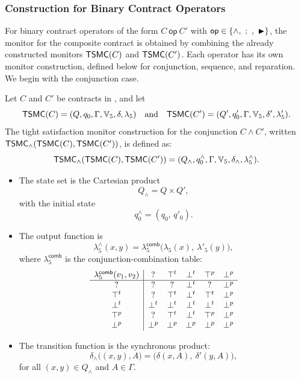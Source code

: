 \subsubsection*{Construction for Binary Contract Operators}

For binary contract operators of the form $C\ \textsf{op}\ C'$ with
$\textsf{op} \in \{\wedge,\ ;\ ,\ \repair\}$, the monitor for the composite contract is obtained by combining the already constructed monitors
$\mathsf{TSMC}(C)$ and $\mathsf{TSMC}(C')$. Each operator has its own monitor construction,
defined below for conjunction, sequence, and reparation. We begin with the
conjunction case.


\begin{definition}
\label{def:moore-5-conj}
Let $C$ and $C'$ be contracts in \cDL, and let
\[
\mathsf{TSMC}(C)  = (Q, q_0, \Gamma, \mathbb{V}_5 , \delta, \lambda_5)
\quad\text{and}\quad
\mathsf{TSMC}(C') = (Q', q'_0, \Gamma, \mathbb{V}_5 , \delta', \lambda'_5).
\]
The tight satisfaction monitor construction for the conjunction
$C \wedge C'$, written\\ $\mathsf{TSMC}_{\wedge}(\mathsf{TSMC}(C),\mathsf{TSMC}(C'))$, is defined as:
\[
\mathsf{TSMC}_{\wedge}(\mathsf{TSMC}(C),\mathsf{TSMC}(C'))
  = (Q_{\wedge}, q_0^{\wedge}, \Gamma, \mathbb{V}_5 , \delta_{\wedge}, \lambda_5^{\wedge}).
\]

\begin{itemize}
  \item The state set is the Cartesian product
  \[
    Q_{\wedge} = Q \times Q',
  \]
  with the initial state
  \[
    q_0^{\wedge} = (q_0,\,q'_0).
  \]

  \item The output function is
  \[
    \lambda_5^{\wedge}(x,y) =
    \lambda_{5}^{\textsf{comb}}\!\big(\lambda_5(x),\ \lambda'_5(y)\big),
  \]
  where $\lambda_{5}^{\textsf{comb}}$ is the conjunction-combination table:
  \[
  \begin{array}{c|ccccc}
  \lambda_{5}^{\textsf{comb}}(v_1,v_2) & \mathsf{?} & \top^t & \bot^t & \top^p & \bot^p\\\hline
  \mathsf{?} & \mathsf{?} & \mathsf{?} & \bot^t & \mathsf{?} & \bot^p\\
  \top^t      & \mathsf{?} & \top^t      & \bot^t & \top^t      & \bot^p\\
  \bot^t      & \bot^t      & \bot^t      & \bot^t & \bot^t      & \bot^p\\
  \top^p      & \mathsf{?} & \top^t      & \bot^t & \top^p      & \bot^p\\
  \bot^p      & \bot^p      & \bot^p      & \bot^p & \bot^p      & \bot^p
  \end{array}
  \]

  \item The transition function is the synchronous product:
  \[
    \delta_{\wedge}\big((x,y),A\big)
      = \big(\delta(x,A),\ \delta'(y,A)\big),
  \]
  for all $(x,y)\in Q_{\wedge}$ and $A\in\Gamma$.
\end{itemize}
\end{definition}


